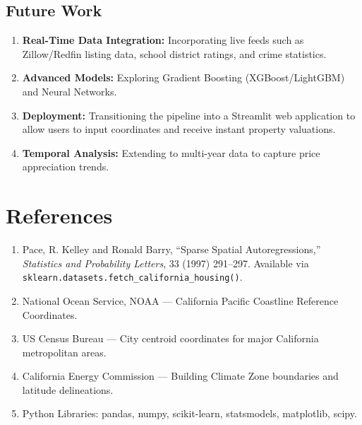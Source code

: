 \documentclass[12pt,a4paper]{article}
\begin{document}
\subsection{Future Work}

\begin{enumerate}
    \item \textbf{Real-Time Data Integration:} Incorporating live feeds such as Zillow/Redfin listing data, school district ratings, and crime statistics.
    \item \textbf{Advanced Models:} Exploring Gradient Boosting (XGBoost/LightGBM) and Neural Networks.
    \item \textbf{Deployment:} Transitioning the pipeline into a Streamlit web application to allow users to input coordinates and receive instant property valuations.
    \item \textbf{Temporal Analysis:} Extending to multi-year data to capture price appreciation trends.
\end{enumerate}

\newpage

\section{References}

\begin{enumerate}
    \item Pace, R. Kelley and Ronald Barry, ``Sparse Spatial Autoregressions,'' \textit{Statistics and Probability Letters}, 33 (1997) 291--297. Available via \texttt{sklearn.datasets.fetch\_california\_housing()}.
    \item National Ocean Service, NOAA --- California Pacific Coastline Reference Coordinates.
    \item US Census Bureau --- City centroid coordinates for major California metropolitan areas.
    \item California Energy Commission --- Building Climate Zone boundaries and latitude delineations.
    \item Python Libraries: pandas, numpy, scikit-learn, statsmodels, matplotlib, scipy.
\end{enumerate}
\end{document}

